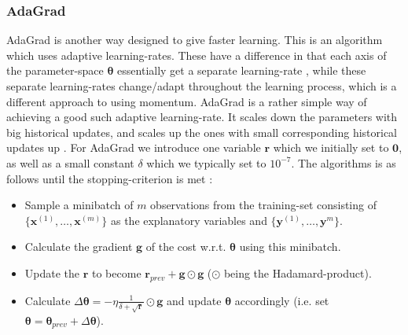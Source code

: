 \documentclass{article}
\begin{document}
\subsubsection{AdaGrad}
\label{adagradsec}
AdaGrad is another way designed to give faster learning. This is an algorithm
which uses adaptive learning-rates. These have a difference in that each axis of
the parameter-space $\bm{\theta}$ essentially get a separate learning-rate
\cite[s.~8.5]{goodfellow2016deep}, while these separate learning-rates change/adapt
throughout the learning process, which is a different approach to using momentum.
AdaGrad is a rather simple way of achieving a good such adaptive learning-rate.
It scales down the parameters with big historical updates, and scales up the
ones with small corresponding historical updates up
\cite[s.~8.5.1]{goodfellow2016deep}.  For AdaGrad we introduce one variable
$\bm{r}$ which we initially set to $\bm{0}$, as well as a small constant
$\delta$ which we typically set to $10^{-7}$. The algorithms is as follows until
the stopping-criterion is met \cite[algorithm~8.4]{goodfellow2016deep}:
\begin{itemize}
      \item Sample a minibatch of $m$ observations from the training-set
            consisting of $\{\bm{x}^{(1)}, \dots, \bm{x}^{(m)}\}$ as the explanatory
            variables and $\{\bm{y}^{(1)}, \dots, \bm{y}^{m}\}$.
      \item Calculate the gradient $\bm{g}$ of the cost w.r.t. $\bm{\theta}$ using
            this minibatch.
      \item Update the $\bm{r}$ to become $\bm{r}_{prev} + \bm{g} \odot \bm{g}$
            ($\odot$ being the Hadamard-product).
      \item Calculate $\Delta \bm{\theta} = -\eta
                  \frac{1}{\delta + \sqrt{\bm{r}}} \odot \bm{g}$ and update
            $\bm{\theta}$ accordingly (i.e. set $\bm{\theta} =
                  \bm{\theta}_{prev} + \Delta \bm{\theta}$).

\end{itemize}
\end{document}
